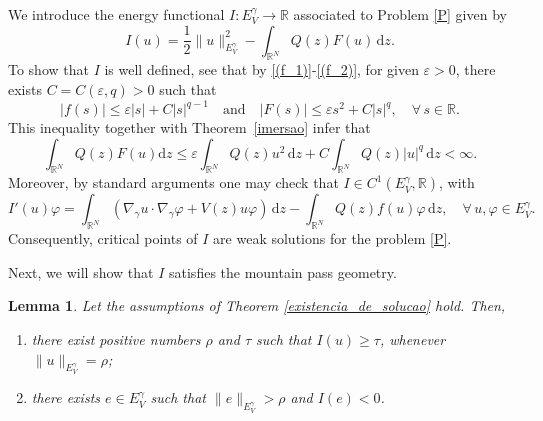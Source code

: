 \documentclass[12pt]{amsart}
\newtheorem{lemma}[theorem]{Lemma}
\newcommand{\R}{\mathbb{R}}
\begin{document}
We introduce the energy functional $I:E_V^\gamma \to \mathbb{R}$ associated to Problem \eqref{P}  given by
$$
I(u) = \frac{1}{2}\|u\|_{E_V^\gamma}^2 - \int_{\R^N}Q(z)F(u) \, \mathrm{d} z.
$$
To show that $I$ is well defined, see that by \ref{(f_1)}-\ref{(f_2)}, for given $\varepsilon>0$, there exists $C=C(\varepsilon,q)>0$ such that
\begin{equation}\label{fcond}
	|f(s)| \leq \varepsilon|s| + C|s|^{q-1}	\quad \mbox{and} \quad |F(s)| \leq \varepsilon s^2 + C|s|^{q}, \quad \forall \, s \in \mathbb{R}.
\end{equation}
This inequality together with Theorem~\ref{imersao} infer that
\begin{equation}\label{des-F-integral}
	\int_{\R^N} Q(z)F(u) \mathrm{d}z \leq \varepsilon\int_{\R^N}Q(z)u^2\, \mathrm{d}z  + C\int_{\R^N}Q(z)|u|^q \,\mathrm{d}z<\infty.
\end{equation}
Moreover, by standard arguments one may check that $I \in C^1(E_V^\gamma,\mathbb{R})$, with
\begin{equation}\label{derivada-Gateaux}
	I'(u)\varphi = \int_{\mathbb{R}^N}\left(\nabla_\gamma u \cdot \nabla_\gamma \varphi + V(z)u\varphi\right)\,\mathrm{d}z  - \int_{\mathbb{R}^N}Q(z)f(u)\varphi\,\mathrm{d}z, \quad \forall \, u,\varphi \in E_V^\gamma.
\end{equation}
Consequently, critical points of $I$ are weak solutions for the problem \eqref{P}.


Next, we will show that $I$ satisfies the mountain pass geometry.




\begin{lemma}\label{MPGeom}
	Let the assumptions of Theorem \ref{existencia_de_solucao} hold. Then,
	\begin{enumerate}
		\item[$(a)$] there exist positive numbers $\rho$ and $\tau$ such that $I(u) \geq \tau$, whenever $\|u\|_{E_V^\gamma}=\rho$; 
		\item[$(b)$] there exists $e \in E_V^\gamma$ such that $\|e\|_{E_V^\gamma}>\rho$ and $I(e)<0$.
	\end{enumerate}
\end{lemma}
\end{document}
